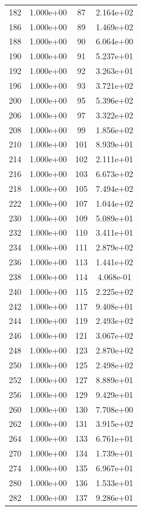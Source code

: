 \documentclass[12pt]{article}
\begin{document}
\begin{longtable}{@{}cccc@{}}
182 & 1.000e+00 & 87 & 2.164e+02 \\
186 & 1.000e+00 & 89 & 1.469e+02 \\
188 & 1.000e+00 & 90 & 6.064e+00 \\
190 & 1.000e+00 & 91 & 5.237e+01 \\
192 & 1.000e+00 & 92 & 3.263e+01 \\
196 & 1.000e+00 & 93 & 3.721e+02 \\
200 & 1.000e+00 & 95 & 5.396e+02 \\
206 & 1.000e+00 & 97 & 3.322e+02 \\
208 & 1.000e+00 & 99 & 1.856e+02 \\
210 & 1.000e+00 & 101 & 8.939e+01 \\
214 & 1.000e+00 & 102 & 2.111e+01 \\
216 & 1.000e+00 & 103 & 6.673e+02 \\
218 & 1.000e+00 & 105 & 7.494e+02 \\
222 & 1.000e+00 & 107 & 1.044e+02 \\
230 & 1.000e+00 & 109 & 5.089e+01 \\
232 & 1.000e+00 & 110 & 3.411e+01 \\
234 & 1.000e+00 & 111 & 2.879e+02 \\
236 & 1.000e+00 & 113 & 1.441e+02 \\
238 & 1.000e+00 & 114 & 4.068e-01 \\
240 & 1.000e+00 & 115 & 2.225e+02 \\
242 & 1.000e+00 & 117 & 9.408e+01 \\
244 & 1.000e+00 & 119 & 2.493e+02 \\
246 & 1.000e+00 & 121 & 3.067e+02 \\
248 & 1.000e+00 & 123 & 2.870e+02 \\
250 & 1.000e+00 & 125 & 2.498e+02 \\
252 & 1.000e+00 & 127 & 8.889e+01 \\
256 & 1.000e+00 & 129 & 9.429e+01 \\
260 & 1.000e+00 & 130 & 7.708e+00 \\
262 & 1.000e+00 & 131 & 3.915e+02 \\
264 & 1.000e+00 & 133 & 6.761e+01 \\
270 & 1.000e+00 & 134 & 1.739e+01 \\
274 & 1.000e+00 & 135 & 6.967e+01 \\
280 & 1.000e+00 & 136 & 1.533e+01 \\
282 & 1.000e+00 & 137 & 9.286e+01 \\

\end{longtable}
\end{document}
